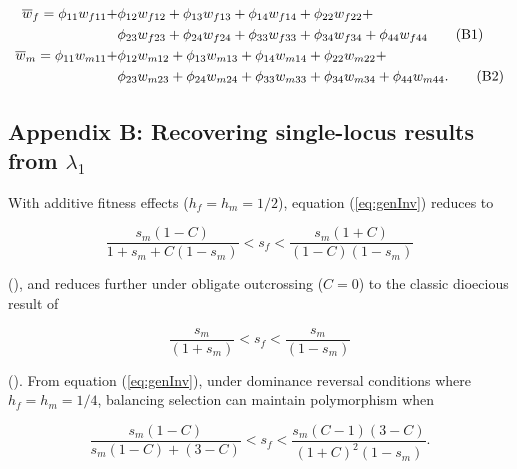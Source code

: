 \documentclass{article}
\newcommand\numberthis{\addtocounter{equation}{1}\tag{\theequation}}
\begin{document}
\begin{align*}
	\overline{w}_f = \phi_{11} w_{f11} + &\phi_{12} w_{f12} + \phi_{13} w_{f13} + \phi_{14} w_{f14} + \phi_{22} w_{f22} + \\ 
				     &\phi_{23} w_{f23} + \phi_{24} w_{f24} + \phi_{33} w_{f33} + \phi_{34} w_{f34} + \phi_{44} w_{f44} \numberthis \\
	\overline{w}_m = \phi_{11} w_{m11} + &\phi_{12} w_{m12} + \phi_{13} w_{m13} + \phi_{14} w_{m14} + \phi_{22} w_{m22} + \\
				     &\phi_{23} w_{m23} + \phi_{24} w_{m24} + \phi_{33} w_{m33} + \phi_{34} w_{m34} + \phi_{44} w_{m44}. \numberthis
\end{align*}





\subsection*{Appendix B: Recovering single-locus results from $\lambda_1$}
\renewcommand{\theequation}{B\arabic{equation}}
\setcounter{equation}{0}
\renewcommand{\thefigure}{B\arabic{figure}}
\setcounter{figure}{0}


With additive fitness effects ($h_f = h_m = 1/2$), equation (\ref{eq:genInv}) reduces to 

\begin{equation} \label{eq:addInv}
	\frac{s_m (1 - C)}{1 + s_m + C(1 - s_m)} < s_f < \frac{s_m(1 + C)}{(1 - C)(1 - s_m)}
\end{equation}

\noindent{} (\citealt{JordanConn2014}), and reduces further under obligate outcrossing ($C = 0$) to the classic dioecious result of

\begin{equation}
	\frac{s_m}{(1 + s_m)} < s_f < \frac{s_m}{(1 - s_m)}
\end{equation}

\noindent{} (\citealt{Kidwell1977}). From equation (\ref{eq:genInv}), under dominance reversal conditions where $h_f = h_m = 1/4$, balancing selection can maintain polymorphism when

\begin{equation} \label{eq:domRevInv}
	\frac{s_m (1 - C)}{s_m(1 - C) + (3 - C)} < s_f < \frac{s_m(C - 1)(3 - C)}{(1 + C)^2 (1 - s_m)}.
\end{equation}
\end{document}
